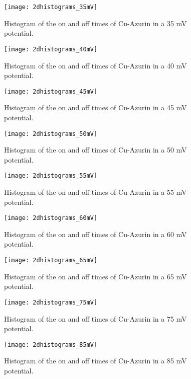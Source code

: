 \documentclass[twoside,single]{lion-msc}
\begin{document}
\begin{figure}
\centering
\texttt{[image: 2dhistograms\_35mV]}
\caption{Histogram of the on and off times of Cu-Azurin in a 35 mV potential.}
\label{2dhistograms_0mV}
\end{figure}

\begin{figure}
\centering
\texttt{[image: 2dhistograms\_40mV]}
\caption{Histogram of the on and off times of Cu-Azurin in a 40 mV potential.}
\label{2dhistograms_0mV}
\end{figure}

\begin{figure}
\centering
\texttt{[image: 2dhistograms\_45mV]}
\caption{Histogram of the on and off times of Cu-Azurin in a 45 mV potential.}
\label{2dhistograms_0mV}
\end{figure}

\begin{figure}
\centering
\texttt{[image: 2dhistograms\_50mV]}
\caption{Histogram of the on and off times of Cu-Azurin in a 50 mV potential.}
\label{2dhistograms_0mV}
\end{figure}

\begin{figure}
\centering
\texttt{[image: 2dhistograms\_55mV]}
\caption{Histogram of the on and off times of Cu-Azurin in a 55 mV potential.}
\label{2dhistograms_0mV}
\end{figure}

\begin{figure}
\centering
\texttt{[image: 2dhistograms\_60mV]}
\caption{Histogram of the on and off times of Cu-Azurin in a 60 mV potential.}
\label{2dhistograms_0mV}
\end{figure}

\begin{figure}
\centering
\texttt{[image: 2dhistograms\_65mV]}
\caption{Histogram of the on and off times of Cu-Azurin in a 65 mV potential.}
\label{2dhistograms_0mV}
\end{figure}

\begin{figure}
\centering
\texttt{[image: 2dhistograms\_75mV]}
\caption{Histogram of the on and off times of Cu-Azurin in a 75 mV potential.}
\label{2dhistograms_0mV}
\end{figure}

\begin{figure}
\centering
\texttt{[image: 2dhistograms\_85mV]}
\caption{Histogram of the on and off times of Cu-Azurin in a 85 mV potential.}
\label{2dhistograms_0mV}
\end{figure}
\end{document}
